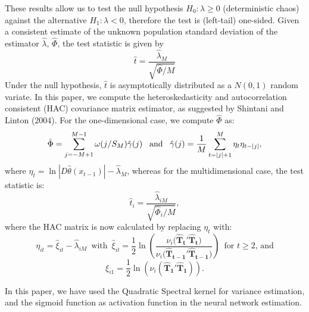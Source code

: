\documentclass[12pt]{article}
\begin{document}
These results allow us to test the null hypothesis $H_{0}:\lambda\geq 0$
(deterministic chaos) against
the alternative $H_{1}:\lambda<0$,
therefore the test is (left-tail) one-sided.
Given a consistent estimate of the unknown
population standard deviation of the estimator $\hat{\lambda}$, $\hat{\Phi}$, the test
statistic is given by
\begin{equation}
\hat{t}=\frac{\hat{\lambda}_{M}}{\sqrt{\hat{\Phi}/M}}
\end{equation}
Under the null hypothesis, $\hat{t}$ is asymptotically distributed as a $N(0, 1)$
random variate. In this paper, we compute the heteroskedasticity and autocorrelation
consistent (HAC) covariance matrix estimator, as suggested by Shintani
and Linton (2004). For the one-dimensional case, we compute $\hat{\Phi}$ as:
\begin{equation}
\hat{\Phi}=\sum_{j=-M+1}^{M-1}\omega(j/S_M)\hat{\gamma}(j)\text{\,\,\,\,\,and\,\,\,\,\,}
\hat{\gamma}(j)=\frac{1}{M}\sum_{t=|j|+1}^{M}\eta_t\eta_{t-|j|},
\end{equation}
where $\eta_t=\ln|D\hat{\theta}(x_{t-1})|-\hat{\lambda}_M$, whereas for the multidimensional case, the test statistic is:
\begin{equation}
\hat{t}_i=\frac{\hat{\lambda}_{iM}}{\sqrt{\hat{\Phi}_i/M}},
\end{equation}
where the HAC matrix is now calculated by replacing $\eta_t$ with:
\begin{equation}
\eta_{it}=\hat{\xi}_{it}-\hat{\lambda}_{iM}\,\,\,\text{with}\,\,\,\hat{\xi}_{it}=\frac{1}{2}\ln\left(\frac{\nu_i(\mathbf{\hat{T}_t'\hat{T}_t)}}{\nu_i(\mathbf{\hat{T}_{t-1}'\hat{T}_{t-1})}}\right)\,\,\,\text{for $t\geq 2$, and}
\end{equation}
\begin{equation}
\xi_{i1}=\frac{1}{2}\ln\left(\nu_i(\mathbf{\hat{T}_1'\hat{T}_1})\right).
\end{equation}

In this paper, we have used the  Quadratic Spectral kernel for variance estimation, and the sigmoid function as activation function in the neural network estimation.
\end{document}
